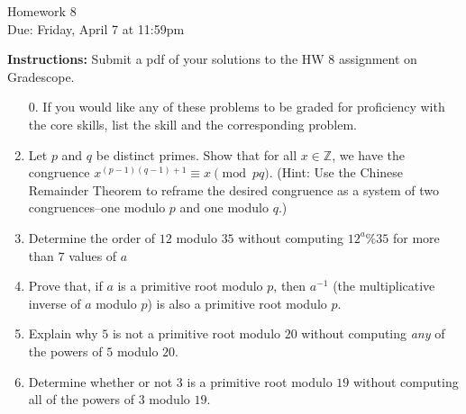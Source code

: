 \documentclass[12pt]{article}
\begin{document}
\begin{center}
{\Large Homework 8}\\
Due: Friday,  April 7 at 11:59pm\\


\end{center}
{\bf Instructions:} Submit a pdf of your solutions to the HW 8 assignment on Gradescope.  



\begin{enumerate}
\item[0.] If you would like any of these problems to be graded for proficiency with the core skills, list the skill and the corresponding problem. 

\item Let $p$ and $q$ be distinct primes.  Show that for all $x \in \mathbb{Z}$, we have the congruence $x^{(p-1)(q-1)+1} \equiv x \pmod{pq}$.  (Hint: Use the Chinese Remainder Theorem to reframe the desired congruence as a system of two congruences--one modulo $p$ and one modulo $q$.)

\item Determine the order of $12$ modulo $35$ without computing $12^a\%35$ for more than $7$ values of $a$

\item Prove that, if $a$ is a primitive root modulo $p$, then $a^{-1}$ (the multiplicative inverse of $a$ modulo $p$) is also a primitive root modulo $p$. 

\item Explain why $5$ is not a primitive root modulo $20$ without computing \emph{any} of the powers of $5$ modulo $20$. 

\item Determine whether or not $3$ is a primitive root modulo $19$ without computing all of the powers of $3$ modulo $19$. 





\end{enumerate}
\end{document}
